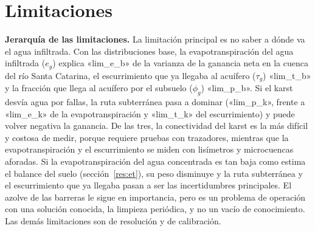 \section{Limitaciones}

\textbf{Jerarquía de las limitaciones.} La limitación principal es no saber a dónde va el agua infiltrada. Con las distribuciones base, la evapotranspiración del agua infiltrada ($e_g$) explica «lim_e_b» de la varianza de la ganancia neta en la cuenca del río Santa Catarina, el escurrimiento que ya llegaba al acuífero ($\tau_g$) «lim_t_b» y la fracción que llega al acuífero por el subsuelo ($\phi_g$) «lim_p_b». Si el karst desvía agua por fallas, la ruta subterránea pasa a dominar («lim_p_k», frente a «lim_e_k» de la evapotranspiración y «lim_t_k» del escurrimiento) y puede volver negativa la ganancia. De las tres, la conectividad del karst es la más difícil y costosa de medir, porque requiere pruebas con trazadores, mientras que la evapotranspiración y el escurrimiento se miden con lisímetros y microcuencas aforadas. Si la evapotranspiración del agua concentrada es tan baja como estima el balance del suelo (sección~\ref{res:et}), su peso disminuye y la ruta subterránea y el escurrimiento que ya llegaba pasan a ser las incertidumbres principales. El azolve de las barreras le sigue en importancia, pero es un problema de operación con una solución conocida, la limpieza periódica, y no un vacío de conocimiento. Las demás limitaciones son de resolución y de calibración.

